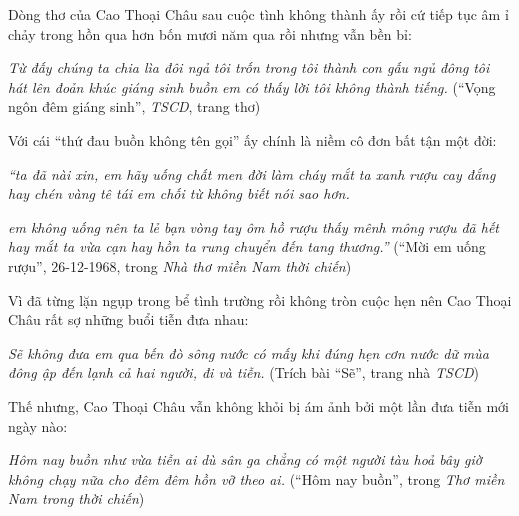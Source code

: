 \documentclass[../main.tex]{subfiles}
\begin{document}
\begin{multicols}{2}
\begin{blockquote}
\end{blockquote}
 
Dòng thơ của Cao Thoại Châu sau cuộc tình không thành ấy rồi cứ tiếp tục âm ỉ chảy trong hồn qua hơn bốn mươi năm qua rồi nhưng vẫn bền bỉ: 
\begin{blockquote}
        
\textit{Từ đấy chúng ta chia lìa đôi ngả}        
\textit{tôi trốn trong tôi thành con gấu ngủ đông}        
\textit{tôi hát lên đoản khúc giáng sinh buồn}        
\textit{em có thấy lời tôi không thành tiếng.}        
(“Vọng ngôn đêm giáng sinh”, \textit{TSCD}, trang thơ) 

\end{blockquote}
 
Với cái “thứ đau buồn không tên gọi” ấy chính là niềm cô đơn bất tận một đời:        
\begin{blockquote}
        
\textit{“ta đã nài xin, em hãy uống}        
\textit{chất men đời làm cháy mắt ta xanh}        
\textit{rượu cay đắng hay chén vàng tê tái} 
\textit{em chối từ không biết nói sao hơn.} 
        
\textit{em không uống nên ta lẻ bạn}        
\textit{vòng tay ôm hồ rượu thấy mênh mông}        
\textit{rượu đã hết hay mắt ta vừa cạn}        
\textit{hay hồn ta rung chuyển đến tang thương.”}        
(“Mời em uống rượu”, 26-12-1968, trong \textit{Nhà thơ miền Nam thời chiến}) 

\end{blockquote}
 
Vì đã từng lặn ngụp trong bể tình trường rồi không tròn cuộc hẹn nên Cao Thoại Châu rất sợ những buổi tiễn đưa nhau: 
\begin{blockquote}
        
\textit{Sẽ không đưa em qua bến đò}        
\textit{sông nước có mấy khi đúng hẹn}        
\textit{cơn nước dữ mùa đông ập đến}        
\textit{lạnh cả hai người, đi và tiễn.}        
(Trích bài “Sẽ”, trang nhà \textit{TSCD}) 

\end{blockquote}
 
Thế nhưng, Cao Thoại Châu vẫn không khỏi bị ám ảnh bởi một lần đưa tiễn mới ngày nào:        
\begin{blockquote}
        
\textit{Hôm nay buồn như vừa tiễn ai}        
\textit{dù sân ga chẳng có một người}        
\textit{tàu hoả bây giờ không chạy nữa}        
\textit{cho đêm đêm hồn vỡ theo ai.}        
(“Hôm nay buồn”, trong \textit{Thơ miền Nam trong thời chiến})  


\end{blockquote}
\end{multicols}
\end{document}
